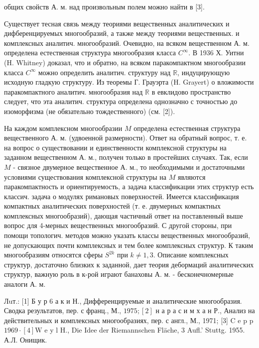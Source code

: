 \documentclass[10pt]{article}
\begin{document}
общих свойств А. м. над произвольным полем можно найти в [3].



Существует тесная связь между теориями вещественных аналитических и дифберенцируемых многообразий, а также между теориями вещественных. и комплексных аналитич. многообразий. Очевидно, на всяком вещественном А. м. определена естественная структура многообразия класса $C^{\infty}$. В 1936 Х. Уитни (H. Whitney) доказал, что и обратно, на всяком паракомпактном многообразии класса $C^{\infty}$ можно определить аналитич. структуру над $\mathbb{R}$, индуцирующую исходную гладкую структуру. Из теоремы Г. Грауэрта (H. Grayert) о вложимости паракомпактного аналитич. многообразия над $\mathbb{R}$ в евклидово пространство следует, что эта аналитич. структура определена однозначно с точностью до изоморфизма (не обязательно тождественного) (см. [2]).



На каждом комплексном многообразии $M$ определена естественная структура вещественного А. м. (удвоенной размерности). Ответ на обратный вопрос, т. е. на вопрос о существовании и единственности комплексной структуры на заданном вещественном А. м., получен только в простейших случаях. Так, если $M$ - связное двумерное вещественное А. м., то необходимыми и достаточными условиями существования комплексной структуры на $M$ являются паракомпактность и ориентируемость, а задача классификации этих структур есть классич. задача о модулях римановых поверхностей. Имеется классификация компактных аналитических поверхностей (т. е. двумерных компактных комплексных многообразий), дающая частичный ответ на поставленный выше вопрос для 4-мерных вещественных многообразий. С другой стороны, при помощи топологич. методов можно указать классы вещественных многообразий, не допускающих почти комплексных и тем более комплексных структур. К таким многообразиям относятся сферы $S^{2 k}$ при $k \neq 1,3$. Описание комплексных структур, достаточно близких к заданной, дает теория дебормаций аналитических структур, важную роль в к-рой играют банаховы А. м. - бесконечномерные аналоги А. м.



Лuт.: [1] Б у р 6 а к и Н., Дифференцируемые и аналитические многообразия. Сводка результатов, пер. с франц., М., $1975 ;[2]$ н а р а с и м х а н Р., Анализ на действительных и комплексных многообразиях, пер. с англ., М., 1971; [3] C e p p $1969 \cdot[4] \mathrm{W}$ e y l H., Die Idee der Riemannschen Fläche, 3 Aufl.' Stuttg. 1955. А.Л. Онищик.
\end{document}
